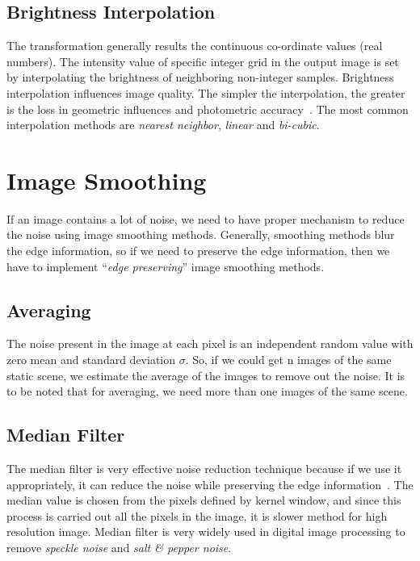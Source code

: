 \subsection*{Brightness Interpolation}
The transformation generally results the continuous co-ordinate values (real numbers). The intensity value of specific integer grid in the output image is set by interpolating the brightness of neighboring non-integer samples. Brightness interpolation influences image quality. The simpler the interpolation, the greater is the loss in geometric influences and photometric accuracy~\cite{Sonka:08}. The most common interpolation methods are \emph{nearest neighbor}, \emph{linear} and \emph{bi-cubic}.

\section{Image Smoothing}
\label{sec:image-smoothing}
If an image contains a lot of noise, we need to have proper mechanism to reduce the noise using image smoothing methods. Generally, smoothing methods blur the edge information, so if we need to preserve the edge information, then we have to implement ``\textit{edge preserving}'' image smoothing methods. 
\subsection*{Averaging}
The noise present in the image at each pixel is an independent random value with zero mean and standard deviation $\sigma$. So, if we could get n images of the same static scene, we estimate the average of the images to remove out the noise. It is to be noted that for averaging, we need more than one images of the same scene.

\subsection*{Median Filter}
The median filter is very effective noise reduction technique because if we use it appropriately, it can reduce the noise while preserving the edge information~\cite{Donoho:09}. The median value is chosen from the pixels defined by kernel window, and since this process is carried out all the pixels in the image, it is slower method for high resolution image. Median filter is very widely used in digital image processing to remove \emph{speckle noise} and \emph{salt \& pepper noise}.  

